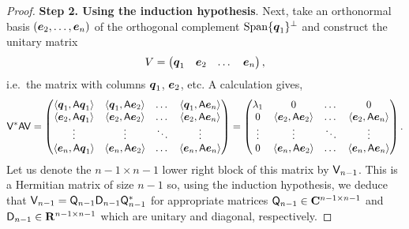 \begin{proof}
            \vspace{.3cm}
            \textbf{Step 2. Using the induction hypothesis}.
            Next,
            take an orthonormal basis $(\mathbf{\boldsymbol{e}}_2, \dotsc, \mathbf{\boldsymbol{e}}_n)$ of the orthogonal complement $\operatorname{Span}\{\mathbf{\boldsymbol{q}}_1\}^\perp$
            and construct the unitary matrix
            \[
                V = \begin{pmatrix} \mathbf{\boldsymbol{q}}_1 & \mathbf{\boldsymbol{e}}_2 & \dots & \mathbf{\boldsymbol{e}}_n \end{pmatrix},
            \]
            i.e.\ the matrix with columns $\mathbf{\boldsymbol{q}}_1$, $\mathbf{\boldsymbol{e}}_2$, etc.
            A calculation gives,
            \[
                \mathsf V^* \mathsf A \mathsf V =
                \begin{pmatrix}
                    \langle\mathbf{\boldsymbol{q}}_1, \mathsf A \mathbf{\boldsymbol{q}}_1\rangle & \langle\mathbf{\boldsymbol{q}}_1, \mathsf A \mathbf{\boldsymbol{e}}_2\rangle & \dots & \langle\mathbf{\boldsymbol{q}}_1, \mathsf A \mathbf{\boldsymbol{e}}_n\rangle \\
                    \langle\mathbf{\boldsymbol{e}}_2, \mathsf A \mathbf{\boldsymbol{q}}_1\rangle & \langle\mathbf{\boldsymbol{e}}_2, \mathsf A \mathbf{\boldsymbol{e}}_2\rangle & \dots & \langle\mathbf{\boldsymbol{e}}_2, \mathsf A \mathbf{\boldsymbol{e}}_n\rangle \\
                    \vdots & \vdots & \ddots & \vdots \\
                    \langle\mathbf{\boldsymbol{e}}_n, \mathsf A \mathbf{\boldsymbol{q}}_1\rangle & \langle\mathbf{\boldsymbol{e}}_n, \mathsf A \mathbf{\boldsymbol{e}}_2\rangle & \dots & \langle\mathbf{\boldsymbol{e}}_n, \mathsf A \mathbf{\boldsymbol{e}}_n\rangle
                \end{pmatrix}
                =
                \begin{pmatrix}
                    \lambda_1 & 0 & \dots & 0 \\
                    0 & \langle\mathbf{\boldsymbol{e}}_2, \mathsf A \mathbf{\boldsymbol{e}}_2\rangle & \dots & \langle\mathbf{\boldsymbol{e}}_2, \mathsf A \mathbf{\boldsymbol{e}}_n\rangle \\
                    \vdots & \vdots & \ddots & \vdots \\
                    0 & \langle\mathbf{\boldsymbol{e}}_n, \mathsf A \mathbf{\boldsymbol{e}}_2\rangle & \dots & \langle\mathbf{\boldsymbol{e}}_n, \mathsf A \mathbf{\boldsymbol{e}}_n\rangle
                \end{pmatrix}.
            \]
            Let us denote the $n-1 \times n-1$ lower right block of this matrix by $\mathsf V_{n-1}$.
            This is a Hermitian matrix of size $n-1$ so,
            using the induction hypothesis,
            we deduce that $\mathsf V_{n-1} = \mathsf Q_{n-1} \mathsf D_{n-1} \mathsf Q_{n-1}^*$
            for appropriate matrices $\mathsf Q_{n-1} \in \mathbf C^{n-1 \times n-1}$ and $\mathsf D_{n-1} \in \mathbf R^{n-1 \times n-1}$
            which are unitary and diagonal, respectively.


\end{proof}
